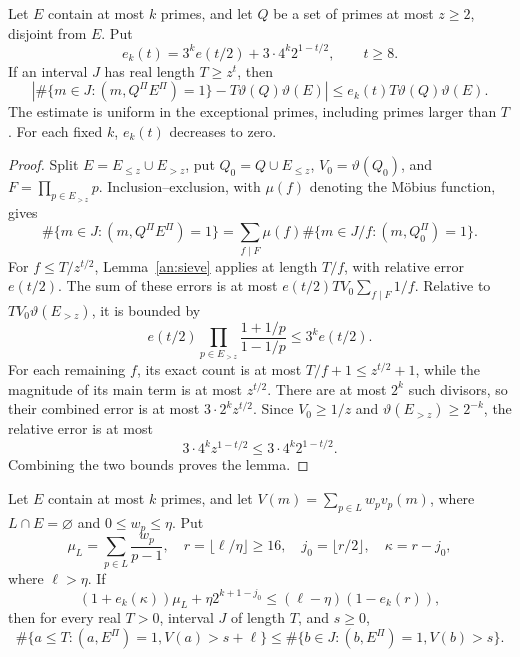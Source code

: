 \begin{lemma}
\label{an:exceptional-sieve}
Let \(E\) contain at most \(k\) primes, and let \(Q\) be a set of
primes at most \(z\ge2\), disjoint from \(E\). Put
\begin{equation}
 e_k(t)=3^ke(t/2)+3\cdot4^k2^{1-t/2},\qquad t\ge8.
 \label{an:exceptional-error}
\end{equation}
If an interval \(J\) has real length \(T\ge z^t\), then
\[
 \left|\#\{m\in J:(m,Q^{\Pi}E^{\Pi})=1\}
       -T\vartheta(Q)\vartheta(E)\right|
 \le e_k(t)T\vartheta(Q)\vartheta(E).
\]
The estimate is uniform in the exceptional primes, including primes
larger than \(T\). For each fixed \(k\), \(e_k(t)\) decreases to zero.
\end{lemma}

\begin{proof}
Split \(E=E_{\le z}\cup E_{>z}\), put
\(Q_0=Q\cup E_{\le z}\), \(V_0=\vartheta(Q_0)\), and
\(F=\prod_{p\in E_{>z}}p\). Inclusion--exclusion, with \(\mu(f)\)
denoting the M\"obius function, gives
\[
 \#\{m\in J:(m,Q^{\Pi}E^{\Pi})=1\}
 =\sum_{f\mid F}\mu(f)\#\{m\in J/f:(m,Q_0^{\Pi})=1\}.
\]
For \(f\le T/z^{t/2}\), Lemma~\ref{an:sieve} applies at length
\(T/f\), with relative error \(e(t/2)\). The sum of these errors is
at most \(e(t/2)TV_0\sum_{f\mid F}1/f\). Relative to
\(TV_0\vartheta(E_{>z})\), it is bounded by
\[
 e(t/2)\prod_{p\in E_{>z}}\frac{1+1/p}{1-1/p}
 \le3^ke(t/2).
\]
For each remaining \(f\), its exact count is at most
\(T/f+1\le z^{t/2}+1\), while the magnitude of its main term is at
most \(z^{t/2}\). There are at most \(2^k\) such divisors, so their
combined error is at most \(3\cdot2^kz^{t/2}\). Since
\(V_0\ge1/z\) and \(\vartheta(E_{>z})\ge2^{-k}\), the relative
error is at most
\[
 3\cdot4^kz^{1-t/2}\le3\cdot4^k2^{1-t/2}.
\]
Combining the two bounds proves the lemma.
\end{proof}

\begin{proposition}
\label{an:conditional-level}
Let \(E\) contain at most \(k\) primes, and let
\(V(m)=\sum_{p\in L}w_pv_p(m)\), where \(L\cap E=\varnothing\) and
\(0\le w_p\le\eta\). Put
\[
 \mu_L=\sum_{p\in L}\frac{w_p}{p-1},\quad
 r=\lfloor\ell/\eta\rfloor\ge16,\quad
 j_0=\lfloor r/2\rfloor,\quad \kappa=r-j_0,
\]
where \(\ell>\eta\). If
\begin{equation}
 (1+e_k(\kappa))\mu_L+\eta2^{k+1-j_0}
 \le(\ell-\eta)(1-e_k(r)),
 \label{an:conditional-condition}
\end{equation}
then for every real \(T>0\), interval \(J\) of length \(T\), and
\(s\ge0\),
\begin{equation}
 \#\{a\le T:(a,E^{\Pi})=1, V(a)>s+\ell\}
 \le\#\{b\in J:(b,E^{\Pi})=1, V(b)>s\}.
 \label{an:conditional-level-ineq}
\end{equation}
\end{proposition}

